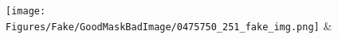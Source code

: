 \documentclass[runningheads]{llncs}
\begin{document}
\begin{figure}[tb]
\texttt{[image: Figures/Fake/GoodMaskBadImage/0475750\_251\_fake\_img.png]} &%
\end{figure}
\end{document}

